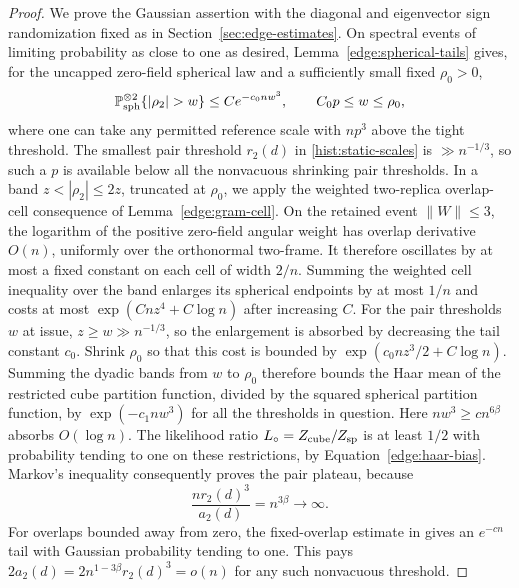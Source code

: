 \begin{proof}
We prove the Gaussian assertion with the diagonal and eigenvector sign
randomization fixed as in Section~\ref{sec:edge-estimates}.  On spectral
events of limiting probability as close to one as desired,
Lemma~\ref{edge:spherical-tails} gives, for the uncapped zero-field spherical
law and a sufficiently small fixed $\rho_0>0$,
\[
 \Prob_{\rm sph}^{\otimes2}\{ |\rho_2|>w\}
       \le C e^{-c_0nw^3},\qquad C_0p\le w\le\rho_0,
\]
where one can take any permitted reference scale with $np^3$ above the
tight threshold.  The smallest pair threshold $r_2(d)$ in
\eqref{hist:static-scales} is $\gg n^{-1/3}$, so such a $p$ is available
below all the nonvacuous shrinking pair thresholds.  In a band
$z<|\rho_2|\le2z$, truncated at $\rho_0$, we apply the weighted
two-replica overlap-cell consequence of Lemma~\ref{edge:gram-cell}.
On the retained event $\|W\|\le3$, the logarithm of the positive zero-field
angular weight has overlap derivative $O(n)$, uniformly over the
orthonormal two-frame.  It therefore oscillates by at most a fixed constant
on each cell of width $2/n$.  Summing the weighted cell inequality over the
band enlarges its spherical endpoints by at most $1/n$ and costs at most
$\exp(Cnz^4+C\log n)$ after increasing $C$.  For the pair thresholds $w$
at issue, $z\ge w\gg n^{-1/3}$, so the enlargement is absorbed by
decreasing the tail constant $c_0$.  Shrink $\rho_0$ so that this
cost is bounded by $\exp(c_0nz^3/2+C\log n)$.  Summing the dyadic bands from
$w$ to $\rho_0$ therefore bounds the Haar mean of the restricted cube
partition function, divided by the squared spherical partition function,
by $\exp(-c_1nw^3)$ for all the thresholds in question.  Here
$nw^3\ge c n^{6\beta}$ absorbs $O(\log n)$.  The likelihood ratio
$L_\circ=Z_{\rm cube}/Z_{\rm sp}$ is at least $1/2$ with probability
tending to one on these restrictions, by Equation~\eqref{edge:haar-bias}.  Markov's
inequality consequently proves the pair plateau, because
\[
 \frac{nr_2(d)^3}{a_2(d)}=n^{3\beta}\longrightarrow\infty.
\]
For overlaps bounded away from zero, the fixed-overlap estimate in
\cite[Lemma~8.2]{FUA} gives an $e^{-c n}$ tail with Gaussian probability tending to
one.  This pays $2a_2(d)=2n^{1-3\beta}r_2(d)^3=o(n)$ for any such
nonvacuous threshold.  %


\end{proof}
